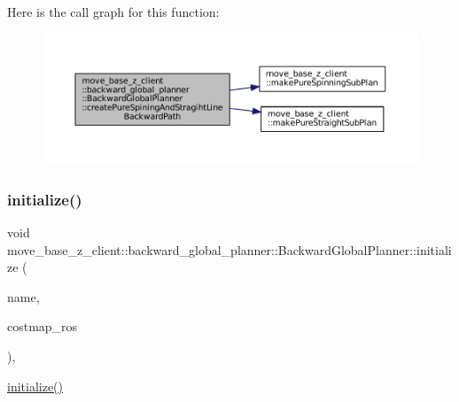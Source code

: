 Here is the call graph for this function\+:
\nopagebreak
\begin{figure}[H]
\begin{center}
\leavevmode
\includegraphics[width=350pt]{classmove__base__z__client_1_1backward__global__planner_1_1BackwardGlobalPlanner_af933b5deeaf3d0022fd93164a34b6068_cgraph}
\end{center}
\end{figure}
\mbox{\label{classmove__base__z__client_1_1backward__global__planner_1_1BackwardGlobalPlanner_a71d3610ea673cb9613eeeae842f028c3}} 
\subsubsection{\texorpdfstring{initialize()}{initialize()}}
{\footnotesize\ttfamily void move\+\_\+base\+\_\+z\+\_\+client\+::backward\+\_\+global\+\_\+planner\+::\+Backward\+Global\+Planner\+::initialize (\begin{DoxyParamCaption}\item[{std\+::string}]{name,  }\item[{costmap\+\_\+2d\+::\+Costmap2\+D\+R\+OS $\ast$}]{costmap\+\_\+ros }\end{DoxyParamCaption})\hspace{0.3cm}{\ttfamily [override]}, {\ttfamily [virtual]}}

\hyperlink{classmove__base__z__client_1_1backward__global__planner_1_1BackwardGlobalPlanner_a71d3610ea673cb9613eeeae842f028c3}{initialize()} 

